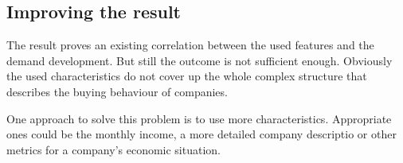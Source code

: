 \subsection{Improving the result}
\label{section:improvingResult}
The result proves an existing correlation between the used features and the demand development. But still
the outcome is not sufficient enough. Obviously the used characteristics do not cover up the whole complex
structure that describes the buying behaviour of companies.

One approach to solve this problem is to use more characteristics. Appropriate ones could be the monthly income,
a more detailed company descriptio or other metrics for a company's economic situation.
